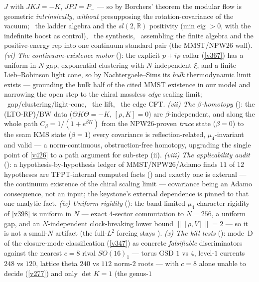 $J$ with $JKJ{=}{-}K$, $JPJ{=}P_-$ --- so by Borchers' theorem the modular flow is geometric \emph{intrinsically},
\emph{without} presupposing the rotation-covariance of the vacuum; \mE\ the ladder algebra and the $sl(2,\mathbb{R})$
positivity (min eig $>0$, with the indefinite boost as control), \mC\ the synthesis, \mO\ assembling the finite
algebra and the positive-energy rep into one continuum standard pair (the MMST/NPW26 wall). \emph{(vi) The
continuum-existence motor} (): the explicit $p{+}ip$ collar (\vref{v367}) has
a uniform-in-$N$ gap, exponential clustering with $N$-independent $\xi$, and a finite Lieb--Robinson light cone, so
by Nachtergaele--Sims its \emph{bulk} thermodynamic limit exists --- grounding the bulk half of the cited MMST
existence in our model and narrowing the open step to the chiral massless \emph{edge} scaling limit;
\mE\ gap/clustering/light-cone, \mC\ the lift, \mO\ the edge CFT. \emph{(vii) The $\beta$-homotopy}
(): the (LTO-RP)/BW data ($\Theta K\Theta{=}{-}K$, $[\rho,K]{=}0$) are
$\beta$-independent, and along the whole path $C_\beta{=}1/(1{+}e^{\beta K})$ from the NPW26-proven \emph{trace}
state ($\beta{=}0$) to the seam KMS state ($\beta{=}1$) every covariance is reflection-related, $\mu_4$-invariant
and valid --- a norm-continuous, obstruction-free homotopy, upgrading the single point of \vref{v426} to a path
argument for sub-step (ii). \emph{(viii) The applicability audit} ():
a hypothesis-by-hypothesis ledger of MMST/NPW26/Adamo finds $11$ of $12$ hypotheses are TFPT-internal computed
facts (\mE) and exactly one is external --- the continuum existence of the chiral scaling limit ---
covariance being an Adamo consequence, not an input; the keystone's external dependence is pinned to that one
analytic fact. \emph{(ix) Uniform rigidity} (): the band-limited
$\mu_4$-character rigidity of \vref{v398} is uniform in $N$ --- exact $4$-sector commutation to $N{=}256$, a
uniform gap, and an $N$-independent clock-breaking lower bound $\|[\rho,V]\|{=}2$ --- so it is not a small-$N$
artifact (the full-$L^2$ forcing stays \mO). \emph{(x) The kill tests} ():
mode~D of the closure-mode classification (\vref{v347}) as concrete \emph{falsifiable} discriminators against the
nearest $c{=}8$ rival $SO(16)_1$ --- torus GSD $1$ vs $4$, level-$1$ currents $248$ vs $120$, lattice theta $240$
vs $112$ norm-$2$ roots --- with $c{=}8$ alone unable to decide (\vref{v277}) and only $\det K{=}1$ (the genus-$1$
